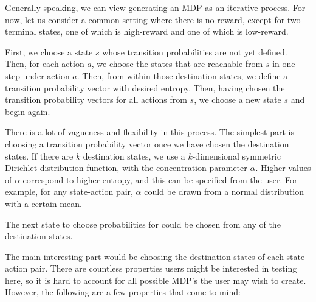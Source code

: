 \documentclass{article}
\begin{document}
Generally speaking, we can view generating an MDP as an iterative process. For now, let us consider a common setting where there is no reward, except for two terminal states, one of which is high-reward and one of which is low-reward.

First, we choose a state $s$ whose transition probabilities are not yet defined. Then, for each action $a$, we choose the states that are reachable from $s$ in one step under action $a$. Then, from within those destination states, we define a transition probability vector with desired entropy. Then, having chosen the transition probability vectors for all actions from $s$, we choose a new state $s$ and begin again.

There is a lot of vagueness and flexibility in this process. The simplest part is choosing a transition probability vector once we have chosen the destination states. If there are $k$ destination states, we use a $k$-dimensional symmetric Dirichlet distribution function, with the concentration parameter $\alpha$. Higher values of $\alpha$ correspond to higher entropy, and this can be specified from the user. For example, for any state-action pair, $\alpha$ could be drawn from a normal distribution with a certain mean.

The next state to choose probabilities for could be chosen from any of the destination states.

The main interesting part would be choosing the destination states of each state-action pair. There are countless properties users might be interested in testing here, so it is hard to account for all possible MDP's the user may wish to create. However, the following are a few properties that come to mind:
\end{document}

